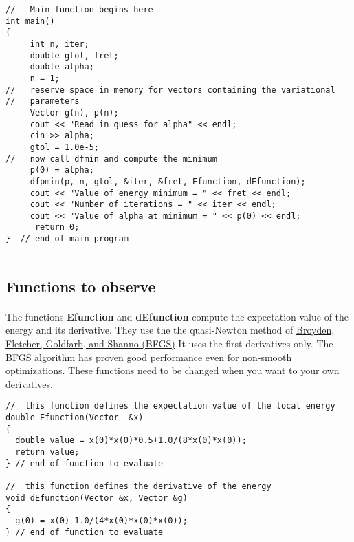 \documentclass[%
oneside,                 %
final,                   %
10pt]{article}
\begin{document}
\begin{verbatim}
//   Main function begins here
int main()
{
     int n, iter;
     double gtol, fret;
     double alpha;
     n = 1;
//   reserve space in memory for vectors containing the variational
//   parameters
     Vector g(n), p(n);
     cout << "Read in guess for alpha" << endl;
     cin >> alpha;
     gtol = 1.0e-5;
//   now call dfmin and compute the minimum
     p(0) = alpha;
     dfpmin(p, n, gtol, &iter, &fret, Efunction, dEfunction);
     cout << "Value of energy minimum = " << fret << endl;
     cout << "Number of iterations = " << iter << endl;
     cout << "Value of alpha at minimum = " << p(0) << endl;
      return 0;
}  // end of main program


\end{verbatim}



\subsection*{Functions to observe}

\paragraph{}
The functions \textbf{Efunction} and \textbf{dEfunction} compute the expectation value of the energy and its derivative.
They use the the quasi-Newton method of \href{{https://www.springer.com/it/book/9780387303031}}{Broyden, Fletcher, Goldfarb, and Shanno (BFGS)}
It uses the first derivatives only. The BFGS algorithm has proven good performance even for non-smooth optimizations. 
These functions need to be changed when you want to your own derivatives.













\begin{verbatim}
//  this function defines the expectation value of the local energy
double Efunction(Vector  &x)
{
  double value = x(0)*x(0)*0.5+1.0/(8*x(0)*x(0));
  return value;
} // end of function to evaluate

//  this function defines the derivative of the energy 
void dEfunction(Vector &x, Vector &g)
{
  g(0) = x(0)-1.0/(4*x(0)*x(0)*x(0));
} // end of function to evaluate

\end{verbatim}
\end{document}
